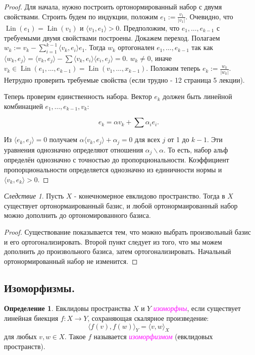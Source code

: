 \documentclass[a4paper,100pt]{article}
\theoremstyle{indented}
\theoremstyle{definition}
\newtheorem{defn}{Определение}
\theoremstyle{remark}
\newtheorem{cons}{Следствие}
\DeclareMathOperator{\ra}{\rightarrow}
\DeclareMathOperator{\Lin}{Lin}
\begin{document}
\begin{proof}
    Для начала, нужно построить ортонормированный набор с двумя свойствами. Строить будем по индукции, положим $e_1 := \frac{v_1}{|v_1|}$. Очевидно, что $\Lin(e_1) = \Lin(v_1)$ и $\langle v_1, e_1 \rangle >0$. Предположим, что $e_1, \ldots, e_{k-1}$ с требуемыми двумя свойствами построены. Докажем переход. Полагаем $w_k := v_k - \sum_{i=1}^{k-1} \langle v_k, e_i \rangle e_1$. Тогда $w_k$ ортогонален $e_1, \ldots, e_{k-1}$ так как $\langle w_k, e_j \rangle = \langle v_k, e_j \rangle - \sum \langle v_k, e_i \rangle \langle e_i, e_j \rangle = 0$. $w_k \neq 0$, иначе $v_k \in \Lin (e_1, \ldots, e_{k-1}) = \Lin(v_1, \ldots, x_{k-1})$. Положим теперь $e_k := \frac{w_k}{|w_k|}$. Нетрудно проверить требуемые свойства (если трудно - 12 страница 5 лекции). \ 

    Теперь проверим единственность набора. Вектор $e_k$ должен быть линейной комбинацией $e_1, \ldots, e_{k-1}, v_k$:

    \[
        e_k = \alpha v_k + \sum \alpha_i e_i.
    \]

    Из $\langle e_k, e_j \rangle = 0$ получаем $\alpha \langle v_k, e_j \rangle + \alpha_j =0$ для всех $j$ от 1 до $k-1$. Эти уравнения однозначно определяют отношения $\alpha_j \backslash \alpha$. То есть, набор альф определён однозначно с точностью до пропорциональности. Коэффициент пропорциональности определяется однозначно из единичности нормы и $\langle v_k, e_k \rangle > 0$. 
\end{proof}

\begin{cons}
    Пусть $X$ - конечномерное евклидово пространство. Тогда в $X$ существует ортонормаированный базис, и любой ортонормаированный набор можно дополнить до ортономированного базиса.
\end{cons}

\begin{proof}
    Существование показывается тем, что можно выбрать произвольный базис и его ортогонализировать. Второй пункт следует из того, что мы можем дополнить до произвольного базиса, затем ортогонализировать. Начальный ортонормированный набор не изменится.
\end{proof}

\subsection{Изоморфизмы.}

\begin{defn}
    Евклидовы пространства $X$ и $Y$ \textit{\textcolor{magenta}{\hypertarget{s65}{изоморфны}}}, если существует линейная биекция $f:X\ra Y$, сохраняющая скалярное произведение: 
    \[
        \langle f(v), f(w) \rangle_Y = \langle v, w \rangle_X
    \]
    для любых $v, w\in X$. Такое $f$ называется \textit{\textcolor{magenta}{\hypertarget{s66}{изоморфизмом}}} (евклидовых пространств).
\end{defn}
\end{document}
